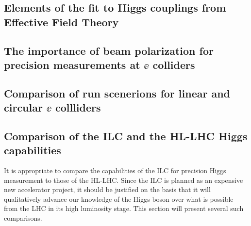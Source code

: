 

\subsection{Elements of the fit to  Higgs couplings from Effective Field Theory}
\label{subsec:global:elements}


\subsection{The importance of beam polarization for precision measurements at $\ee$  colliders}
\label{subsec:polarization}




\subsection{Comparison of run scenerions for linear and circular $\ee$ collliders}
\label{subsec:lincirc}





\subsection{Comparison of the ILC and the HL-LHC Higgs capabilities}
\label{subsec:higgs:ilclhc}











It is appropriate to compare the capabilities of the ILC for precision
Higgs measurement to those of the HL-LHC.  Since the ILC is planned as
an expensive new accelerator project, it should be justified on the
basis that it will qualitatively advance our knowledge of the Higgs
boson over what is possible from the LHC in its high luminosity stage.  
This section will present several such comparisons.


